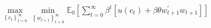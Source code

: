 \documentclass[preview]{standalone}
\begin{document}
\begin{align*}
\max_{\left\{c_t\right\}_{t=0}^{\infty}} \min_{\left\{w_{t+1}\right\}_{t=0}^{\infty}} \mathbb{E}_0 \left[\sum_{t=0}^{\infty} \beta^t \left[u(c_t)+\beta  \theta w_{t+1}^{\prime}w_{t+1} \right]\right]
\end{align*}
\end{document}
